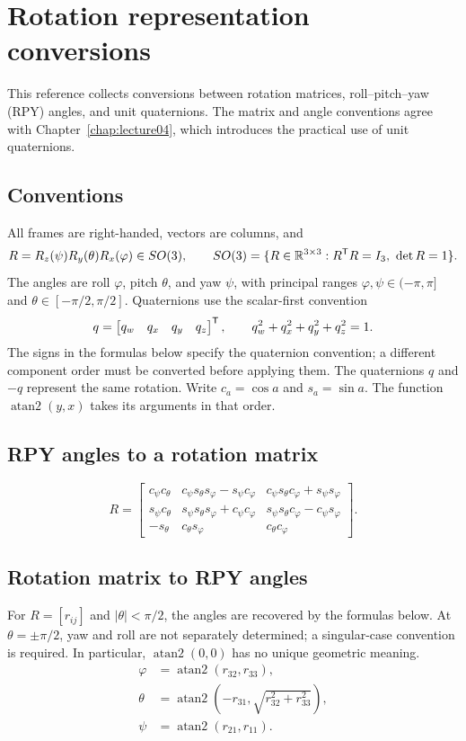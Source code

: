 \chapter{Rotation representation conversions}
\label{app:rotation-conversions}
\begingroup
\small

This reference collects conversions between rotation matrices,
roll--pitch--yaw (RPY) angles, and unit quaternions. The matrix and angle
conventions agree with Chapter~\ref{chap:lecture04}, which introduces the
practical use of unit quaternions.

\section*{Conventions}
All frames are right-handed, vectors are columns, and
\[
 R=R_z(\psi)R_y(\theta)R_x(\varphi)\in SO(3),\qquad
 SO(3)=\{R\in\mathbb{R}^{3\times3}:R^{\mathsf T} R=I_3,\ \det R=1\}.
\]
The angles are roll $\varphi$, pitch $\theta$, and yaw $\psi$, with principal
ranges $\varphi,\psi\in(-\pi,\pi]$ and $\theta\in[-\pi/2,\pi/2]$.
Quaternions use the scalar-first convention
\[
 q=\begin{bmatrix}q_w&q_x&q_y&q_z\end{bmatrix}^{\mathsf T},\qquad
 q_w^2+q_x^2+q_y^2+q_z^2=1.
\]
The signs in the formulas below specify the quaternion convention; a different
component order must be converted before applying them. The quaternions $q$
and $-q$ represent the same rotation. Write $c_a=\cos a$ and $s_a=\sin a$.
The function $\operatorname{atan2}(y,x)$ takes its arguments in that order.

\section*{RPY angles to a rotation matrix}
\[
 R=\begin{bmatrix}
 c_\psi c_\theta & c_\psi s_\theta s_\varphi-s_\psi c_\varphi & c_\psi s_\theta c_\varphi+s_\psi s_\varphi\\
 s_\psi c_\theta & s_\psi s_\theta s_\varphi+c_\psi c_\varphi & s_\psi s_\theta c_\varphi-c_\psi s_\varphi\\
 -s_\theta & c_\theta s_\varphi & c_\theta c_\varphi
 \end{bmatrix}.
\]

\section*{Rotation matrix to RPY angles}
For $R=[r_{ij}]$ and $|\theta|<\pi/2$,
the angles are recovered by the formulas below. At $\theta=\pm\pi/2$, yaw
and roll are not separately determined; a singular-case convention is required.
In particular, $\operatorname{atan2}(0,0)$ has no unique geometric meaning.
\[
 \begin{aligned}
 \varphi&=\operatorname{atan2}(r_{32},r_{33}),\\
 \theta&=\operatorname{atan2}\!\left(-r_{31},\sqrt{r_{32}^2+r_{33}^2}\right),\\
 \psi&=\operatorname{atan2}(r_{21},r_{11}).
 \end{aligned}
\]
\clearpage

